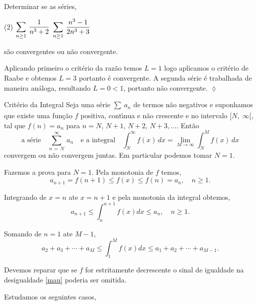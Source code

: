 \begin{exer}
Determinar se as s\'{e}ries,
\begin{tasks}[label=(\alph*),item-indent=6em,label-width=4ex,ref=(\alph*)](2)
\task \(\displaystyle\sum_{n\geq 1}\,\frac{1}{n^3+2} \)
\task \(\displaystyle \sum_{n\geq 1}\,\frac{n^3-1}{2n^3+3}\)
\end{tasks}
s\~{a}o  convergentes ou n\~{a}o convergente.
\end{exer}

\solo Aplicando primeiro o crit\'{e}rio da raz\~{a}o temos $L=1$ logo
aplicamos o crit\'{e}rio de Raabe e obtemos $L=3$ portanto \'{e}
convergente. A segunda s\'{e}rie \'{e} trabalhada de maneira an\'{a}loga,
resultando $L=0<1$, portanto n\~{a}o convergente.  \hfill \(\lozenge\)

\begin{theoc}{Crit\'{e}rio da Integral}{}
Seja uma s\'{e}rie $\sum_{}\,a_{n}$ de termos n\~{a}o negativos
e suponhamos que existe uma fun\c{c}\~{a}o $f$ positiva, cont\'{\i}nua e n\~{a}o
crescente e no intervalo $[N, \; \infty[$, tal que $f(n)=a_n$ para
$n=N$, $N+1$, $N+2$, $N+3,\ldots$. Ent\~{a}o
\begin{equation*}
  \text{a série}\quad \sum_{n\,=\, N}^{\infty}\,a_{n} \quad \text{e a integral} \quad  
  \int_N^{\infty}\!f(x)\,dx=\lim_{M\to \infty} \int_N^{M}\!f(x)\,dx
\end{equation*}
convergem ou n\~{a}o convergem juntas. Em particular podemos tomar $N=1$.
\end{theoc}

\prova Fazemos a prova para $N=1$. Pela monotonia de $f$ temos,
\begin{equation*}
    a_{n+1}=f(n+1)\le f(x)\le f(n)=a_n, \quad n\ge 1.
\end{equation*}

Integrando de $x=n$ ate $x=n+1$ e pela monotonia da integral
obtemos,
\begin{equation*}
    a_{n+1}\le \int_n^{n+1}f(x)dx\le a_n, \quad n\ge 1.
\end{equation*}

Somando de $n=1$ ate $M-1$,
\begin{equation}\label{mau}
    a_2+a_3+\cdots+a_{M}\le \int_1^Mf(x)dx\le
    a_1+a_2+\cdots+a_{M-1}.
\end{equation}

Devemos reparar que se $f$ for estritamente decrescente o sinal de
igualdade na desigualdade \eqref{mau} poderia ser omitida.

Estudamos os seguintes casos,

